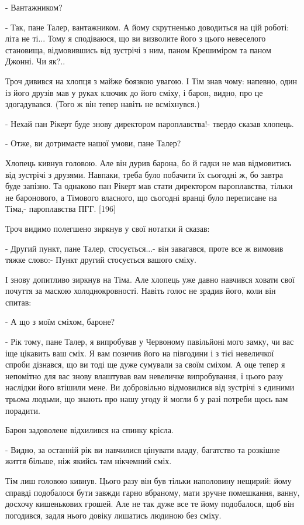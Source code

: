 - Вантажником?

- Так, пане Талер, вантажником. А йому скрутненько доводиться на цій роботі: літа не ті... Тому я сподіваюся, що ви визволите його з цього невеселого становища, відмовившись від зустрічі з ним, паном Крешиміром та паном Джонні. Чи як?..

Троч дивився на хлопця з майже боязкою увагою. І Тім знав чому: напевно, один із його друзів мав у руках ключик до його сміху, і барон, видно, про це здогадувався. (Того ж він тепер навіть не всміхнувся.)

- Нехай пан Рікерт буде знову директором пароплавства!- твердо сказав хлопець.

- Отже, ви дотримаєте нашої умови, пане Талер?

Хлопець кивнув головою. Але він дурив барона, бо й гадки не мав відмовитись від зустрічі з друзями. Навпаки, треба було побачити їх сьогодні ж, бо завтра буде запізно. Та однаково пан Рікерт мав стати директором пароплавства, тільки не баронового, а Тімового власного, що сьогодні вранці було переписане на Тіма,- пароплавства ПГГ. [196]

Троч видимо полегшено зиркнув у свої нотатки й сказав:

- Другий пункт, пане Талер, стосується...- він завагався, проте все ж вимовив тяжке слово:- Пункт другий стосується вашого сміху.

І знову допитливо зиркнув на Тіма. Але хлопець уже давно навчився ховати свої почуття за маскою холоднокровності. Навіть голос не зрадив його, коли він спитав:

- А що з моїм сміхом, бароне?

- Рік тому, пане Талер, я випробував у Червоному павільйоні мого замку, чи вас іще цікавить ваш сміх. Я вам позичив його на півгодини і з тієї невеличкої спроби дізнався, що ви тоді ще дуже сумували за своїм сміхом. А оце тепер я непомітно для вас знову влаштував вам невеличке випробування, ї цього разу наслідки його втішили мене. Ви добровільно відмовилися від зустрічі з єдиними трьома людьми, що знають про нашу угоду й могли б у разі потреби щось вам порадити.

Барон задоволене відхилився на спинку крісла.

- Видно, за останній рік ви навчилися цінувати владу, багатство та розкішне життя більше, ніж якийсь там нікчемний сміх.

Тім лиш головою кивнув. Цього разу він був тільки наполовину нещирий: йому справді подобалося бути завжди гарно вбраному, мати зручне помешкання, ванну, досхочу кишенькових грошей. Але не так дуже все те йому подобалося, щоб він погодився, задля нього довіку лишатись людиною без сміху.

